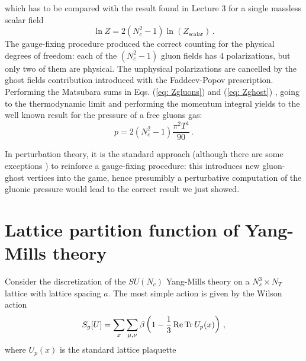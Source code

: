 \documentclass{article}
\begin{document}
which has to be compared with the result found in Lecture 3 for a single massless scalar field
\begin{equation}
    \ln Z = 2(N_c^2 - 1) \ln(Z_{\textrm{scalar}}) \, .
\end{equation}
The gauge-fixing procedure produced the correct counting for the physical degrees of freedom: each of the $(N_c^2 - 1)$ gluon fields has 4 polarizations, but only two of them are physical. The unphysical polarizations 
are cancelled by the ghost fields contribution introduced with the Faddeev-Popov prescription.
Performing the Matsubara sums in Eqs. (\ref{eq: Zgluons}) and (\ref{eq: Zghost}) \cite{Philipsen:2010gj}, going to the thermodynamic limit and performing the momentum integral 
yields to the well known result for the pressure of a free gluons gas:
\begin{equation}
    p = 2(N_c^2 - 1) \frac{\pi^2 T^4}{90} \, .
\end{equation}

In perturbation theory, it is the standard approach (although there are some exceptions \cite{Parisi:1980ys}) to reinforce a gauge-fixing procedure: this introduces new gluon-ghost vertices
into the game, hence presumibly a perturbative computation of the gluonic pressure would lead to the correct result we just showed.






\section{Lattice partition function of Yang-Mills theory}

Consider the discretization of the $SU(N_c)$ Yang-Mills theory on a $N_s^3 \times N_T$ lattice with lattice spacing $a$. The most simple action is given by the Wilson action
\begin{equation}\label{eq: Wilson_S}
    S_g[U] = \sum_x \sum_{\mu, \nu} \beta \left( 1 - \frac{1}{3} \Re \Tr U_p(x)  \right) \, ,
\end{equation}
where $U_p(x)$ is the standard lattice plaquette
\end{document}
